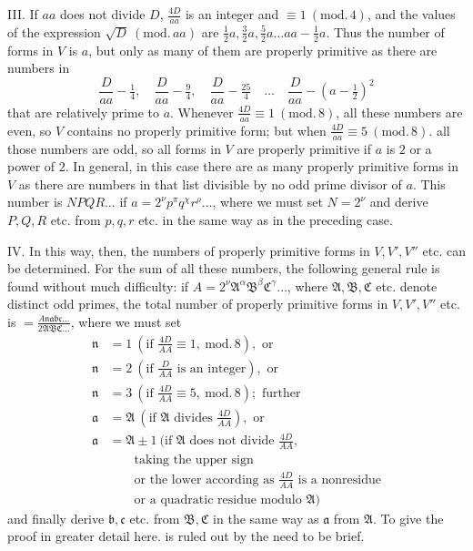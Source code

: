 III. If \(aa\) does not divide \(D\), \(\frac{4D}{aa}\) is an integer and \(\equiv1\ (\mathrm{mod.}\,4)\), and the values of the expression \(\surd D\ (\mathrm{mod.}\,aa)\) are \(\frac12 a,\frac32 a,\frac52 a\ldots aa-\frac12 a\). Thus the number of forms in \(V\) is \(a\), but only as many of them are properly primitive as there are numbers in
\[
\frac{D}{aa}-\tfrac14,\quad\frac{D}{aa}-\tfrac94,\quad\frac{D}{aa}-\tfrac{25}{4}\quad\ldots\quad\frac{D}{aa}-(a-\tfrac12)^2
\]
that are relatively prime to \(a\). Whenever \(\frac{4D}{aa}\equiv1\ (\mathrm{mod.}\,8)\), all these numbers are even, so \(V\) contains no properly primitive form; but when \(\frac{4D}{aa}\equiv5\ (\mathrm{mod.}\,8)\). all those numbers are odd, so all forms in \(V\) are properly primitive if \(a\) is \(2\) or a power of \(2\). In general, in this case there are as many properly primitive forms in \(V\) as there are numbers in that list divisible by no odd prime divisor of \(a\). This number is \(NPQR\ldots\) if \(a=2^\nu p^\pi q^\chi r^\rho\ldots\), where we must set \(N=2^\nu\) and derive \(P,Q,R\) etc. from \(p,q,r\) etc. in the same way as in the preceding case.

IV. In this way, then, the numbers of properly primitive forms in \(V,V',V''\) etc. can be determined. For the sum of all these numbers, the following general rule is found without much difficulty: if \(A=2^\nu\mathfrak{A}^\alpha\mathfrak{B}^\beta\mathfrak{C}^\gamma\ldots\), where \(\mathfrak A,\mathfrak B,\mathfrak C\) etc. denote distinct odd primes, the total number of properly primitive forms in \(V,V',V''\) etc. is \(=\frac{A\mathfrak{nabc}\ldots}{2\mathfrak{ABC}\ldots}\), where we must set
\[
\begin{aligned}
\mathfrak n&=1\ (\text{if }\tfrac{4D}{AA}\equiv1,\ \mathrm{mod.}\,8),\text{ or}\\
\mathfrak n&=2\ (\text{if }\tfrac{D}{AA}\text{ is an integer}),\text{ or}\\
\mathfrak n&=3\ (\text{if }\tfrac{4D}{AA}\equiv5,\ \mathrm{mod.}\,8);\text{ further}\\
\mathfrak a&=\mathfrak A\ (\text{if }\mathfrak A\text{ divides }\tfrac{4D}{AA}\text{}),\text{ or}\\
\mathfrak a&=\mathfrak A\pm1\ (\text{if }\mathfrak A\text{ does not divide }\tfrac{4D}{AA}\text{,}\\ &\qquad\text{taking the upper sign}\\
&\qquad\text{or the lower according as }\tfrac{4D}{AA}\text{ is a nonresidue}\\ &\qquad\text{or a quadratic residue modulo }\mathfrak A)
\end{aligned}
\]
and finally derive \(\mathfrak b,\mathfrak c\) etc. from \(\mathfrak B,\mathfrak C\) in the same way as \(\mathfrak a\) from \(\mathfrak A\). To give the proof in greater detail here. is ruled out by the need to be brief.

